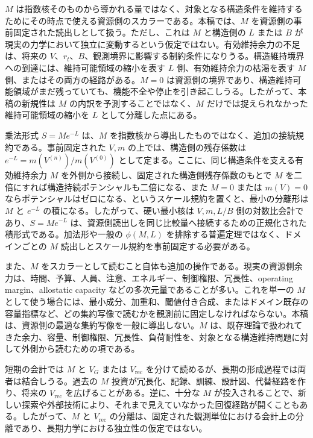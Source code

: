 \documentclass[12pt,a4paper]{article}
\begin{document}
\(M\) は指数核そのものから導かれる量ではなく、対象となる構造条件を維持するためにその時点で使える資源側のスカラーである。本稿では、\(M\) を資源側の事前固定された読出しとして扱う。ただし、これは \(M\) と構造側の \(L\) または \(B\) が現実の力学において独立に変動するという仮定ではない。有効維持余力の不足は、将来の \(V\)、\(r_{t}\)、\(B\)、観測境界に影響する制約条件になりうる。構造維持境界への到達には、維持可能領域の縮小を表す \(L\) 側、有効維持余力の枯渇を表す \(M\) 側、またはその両方の経路がある。\(M=0\) は資源側の境界であり、構造維持可能領域がまだ残っていても、機能不全や停止を引き起こしうる。したがって、本稿の新規性は \(M\) の内訳を予測することではなく、\(M\) だけでは捉えられなかった維持可能領域の縮小を \(L\) として分離した点にある。

乗法形式 \(S=Me^{-L}\) は、\(M\) を指数核から導出したものではなく、追加の接続規約である。事前固定された \(V,m\) の上では、構造側の残存係数は \(e^{-L}=m(V^{(n)})/m(V^{(0)})\) として定まる。ここに、同じ構造条件を支える有効維持余力 \(M\) を外側から接続し、固定された構造側残存係数のもとで \(M\) を二倍にすれば構造持続ポテンシャルも二倍になる、また \(M=0\) または \(m(V)=0\) ならポテンシャルはゼロになる、というスケール規約を置くと、最小の分離形は \(M\) と \(e^{-L}\) の積になる。したがって、硬い最小核は \(V,m,L/B\) 側の対数比会計であり、\(S=Me^{-L}\) は、資源側読出しを同じ比較量へ接続するための正規化された積形式である。加法形や一般の \(\phi(M,L)\) を排除する普遍定理ではなく、ドメインごとの \(M\) 読出しとスケール規約を事前固定する必要がある。

また、\(M\) をスカラーとして読むこと自体も追加の操作である。現実の資源側余力は、時間、予算、人員、注意、エネルギー、制御権限、冗長性、operating margin、allostatic capacity などの多次元量であることが多い。これを単一の \(M\) として使う場合には、最小成分、加重和、閾値付き合成、またはドメイン既存の容量指標など、どの集約写像で読むかを観測前に固定しなければならない。本稿は、資源側の最適な集約写像を一般に導出しない。\(M\) は、既存理論で扱われてきた余力、容量、制御権限、冗長性、負荷耐性を、対象となる構造維持問題に対して外側から読むための項である。

短期の会計では \(M\) と \(V_{G}\) または \(V_{\mathrm{rec}}\) を分けて読めるが、長期の形成過程では両者は結合しうる。過去の \(M\) 投資が冗長化、記録、訓練、設計図、代替経路を作り、将来の \(V_{\mathrm{rec}}\) を広げることがある。逆に、十分な \(M\) が投入されることで、新しい探索や外部技術により、それまで見えていなかった回復経路が開くこともある。したがって、\(M\) と \(V_{\mathrm{rec}}\) の分離は、固定された観測単位における会計上の分離であり、長期力学における独立性の仮定ではない。
\end{document}
